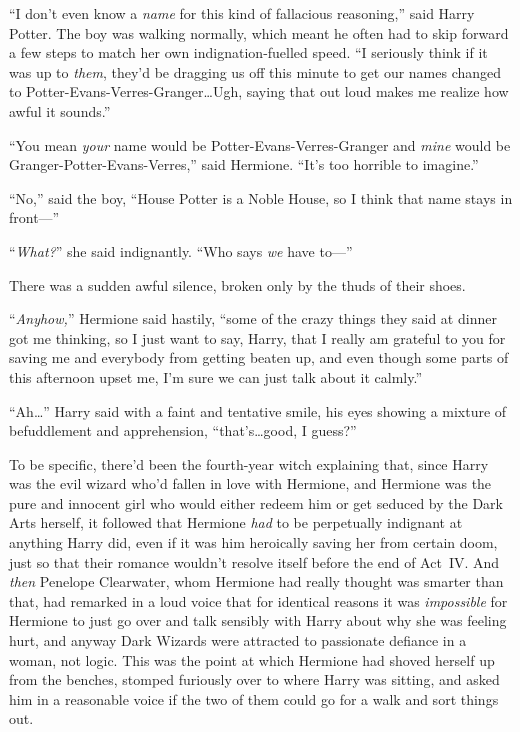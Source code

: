 “I don’t even know a \emph{name} for this kind of fallacious reasoning,” said Harry Potter. The boy was walking normally, which meant he often had to skip forward a few steps to match her own indignation-fuelled speed. “I seriously think if it was up to \emph{them}, they’d be dragging us off this minute to get our names changed to Potter-Evans-Verres-Granger…Ugh, saying that out loud makes me realize how awful it sounds.”

“You mean \emph{your} name would be Potter-Evans-Verres-Granger and \emph{mine} would be Granger-Potter-Evans-Verres,” said Hermione. “It’s too horrible to imagine.”

“No,” said the boy, “House Potter is a Noble House, so I think that name stays in front—”

“\emph{What?}” she said indignantly. “Who says \emph{we} have to—”

There was a sudden awful silence, broken only by the thuds of their shoes.

“\emph{Anyhow,}” Hermione said hastily, “some of the crazy things they said at dinner got me thinking, so I just want to say, Harry, that I really am grateful to you for saving me and everybody from getting beaten up, and even though some parts of this afternoon upset me, I’m sure we can just talk about it calmly.”

“Ah…” Harry said with a faint and tentative smile, his eyes showing a mixture of befuddlement and apprehension, “that’s…good, I guess?”

To be specific, there’d been the fourth-year witch explaining that, since Harry was the evil wizard who’d fallen in love with Hermione, and Hermione was the pure and innocent girl who would either redeem him or get seduced by the Dark Arts herself, it followed that Hermione \emph{had} to be perpetually indignant at anything Harry did, even if it was him heroically saving her from certain doom, just so that their romance wouldn’t resolve itself before the end of Act~IV. And \emph{then} Penelope Clearwater, whom Hermione had really thought was smarter than that, had remarked in a loud voice that for identical reasons it was \emph{impossible} for Hermione to just go over and talk sensibly with Harry about why she was feeling hurt, and anyway Dark Wizards were attracted to passionate defiance in a woman, not logic. This was the point at which Hermione had shoved herself up from the benches, stomped furiously over to where Harry was sitting, and asked him in a reasonable voice if the two of them could go for a walk and sort things out.

